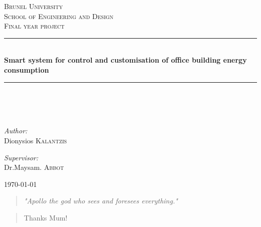 \documentclass[12pt,a4paper,draft]{report}
\author{Student: Dionisios Kalantzis (SID:0733139) \\ Supervisor: Dr. Maysam Abbod}
\begin{document}
\onehalfspacing
\begin{titlepage}
\begin{center}
%
\textsc{\LARGE Brunel University}\\[1.5cm]
\textsc{\LARGE School of Engineering and Design}\\[1cm]
%
\textsc{\Large Final year project}\\[1cm]
\hrule
\hfill\\[0.5cm]
{ \huge \bfseries Smart system for control and customisation of office building energy consumption}\\[0.5cm]
\hrule
\hfill\\[0.5cm]
\ \\
\hfill\\[0.2cm]
\begin{minipage}{0.4\textwidth}
\begin{flushleft} \large
\emph{Author:}\\
Dionysios \textsc{Kalantzis}
\end{flushleft}
\end{minipage}
\begin{minipage}{0.4\textwidth}
\begin{flushright} \large
\emph{Supervisor:} \\
Dr.Maysam. \textsc{Abbot}
\end{flushright}
\end{minipage}
\vfill
{\large \today}
\end{center}
\end{titlepage}
\newpage
%
\newpage
\begin{abstract}
\emph{"Apollo the god who sees and foresees everything."}
\end{abstract}
%
\renewcommand{\abstractname}{Acknowledgements}
\begin{abstract}
 Thanks Mum!
\end{abstract}
%
\newpage
\tableofcontents
\newpage
\listoffigures
%
\pagestyle{fancyplain}
\fancyhf{}
\lhead{\fancyplain{}{\leftmark}}
\rhead{\fancyplain{}{}}
\rfoot{\fancyplain{}{\thepage}}
%
\end{document}
